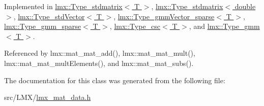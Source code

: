 Implemented in \hyperlink{classlmx_1_1Type__stdmatrix_a90b9f72528b9bd122463611c3628a18c}{lmx\-::\-Type\-\_\-stdmatrix$<$ T $>$}, \hyperlink{classlmx_1_1Type__stdmatrix_a90b9f72528b9bd122463611c3628a18c}{lmx\-::\-Type\-\_\-stdmatrix$<$ double $>$}, \hyperlink{classlmx_1_1Type__stdVector_a70b59a584946a3bf78a3bf93e33521f4}{lmx\-::\-Type\-\_\-std\-Vector$<$ T $>$}, \hyperlink{classlmx_1_1Type__gmmVector__sparse_ad5041be88871fcb7fc0f78303e184c13}{lmx\-::\-Type\-\_\-gmm\-Vector\-\_\-sparse$<$ T $>$}, \hyperlink{classlmx_1_1Type__gmm__sparse_a41dfa3ea72a1af176d48654d7a9a537d}{lmx\-::\-Type\-\_\-gmm\-\_\-sparse$<$ T $>$}, \hyperlink{classlmx_1_1Type__csc_a814cd964f39fa41feffbf0795d3e446d}{lmx\-::\-Type\-\_\-csc$<$ T $>$}, and \hyperlink{classlmx_1_1Type__gmm_a53de84b0522415262e902ffa42157c3c}{lmx\-::\-Type\-\_\-gmm$<$ T $>$}.



Referenced by lmx\-::mat\-\_\-mat\-\_\-add(), lmx\-::mat\-\_\-mat\-\_\-mult(), lmx\-::mat\-\_\-mat\-\_\-mult\-Elements(), and lmx\-::mat\-\_\-mat\-\_\-subs().



The documentation for this class was generated from the following file\-:\begin{DoxyCompactItemize}
\item 
src/\-L\-M\-X/\hyperlink{lmx__mat__data_8h}{lmx\-\_\-mat\-\_\-data.\-h}\end{DoxyCompactItemize}
